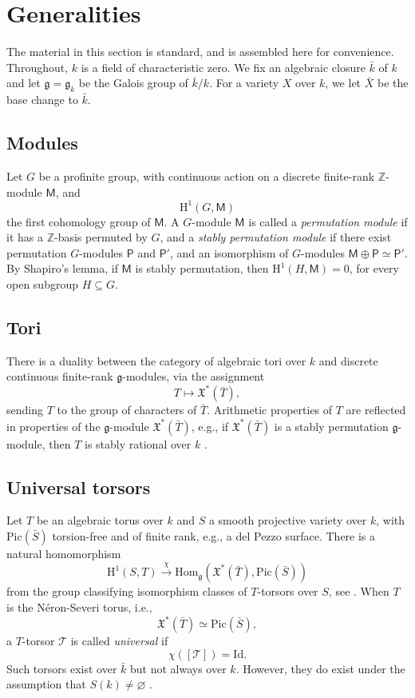 \documentclass[12pt, reqno]{amsart}
\theoremstyle{plain}
\theoremstyle{remark}
\theoremstyle{definition}
\numberwithin{equation}{section}
\def\cT{{\mathcal T}}
\def\bZ{{\mathbb Z}}
\def\rH{{\mathrm H}}
\def\Pic{\mathrm{Pic}}
\def\Hom{\mathrm{Hom}}
\begin{document}
\section{Generalities}
\label{sect:back}

The material in this section is standard, and is assembled here for convenience. 
Throughout, $k$ is a field of characteristic zero. 
We fix an algebraic closure $\bar{k}$ of $k$ and let $\mathfrak g=\mathfrak g_k$ be the Galois group of $\bar{k}/k$. For a variety $X$ over $k$, we let $\bar{X}$ be the base change to $\bar{k}$. 

\subsection*{Modules}
Let $G$ be a profinite group, with continuous action on a discrete finite-rank $\bZ$-module $\mathsf M$, and 
$$
\rH^1(G, \mathsf M)
$$
the first cohomology group of $\mathsf M$.  
A $G$-module $\mathsf M$ is called a {\em permutation module} if it has a $\bZ$-basis permuted by $G$, and a {\em stably permutation module} if there exist permutation $G$-modules $\mathsf P$ and $\mathsf P'$, and an isomorphism of $G$-modules $\mathsf M\oplus \mathsf P\simeq \mathsf P'$. By Shapiro's lemma, if $\mathsf M$ is stably permutation, then $\rH^1(H,\mathsf M)=0$, for every open subgroup $H\subseteq G$. 

\subsection*{Tori}
There is a duality between the category of algebraic tori over $k$ and discrete continuous finite-rank $\mathfrak g$-modules, via the assignment
$$
T \mapsto \mathfrak X^*(\bar{T}), 
$$
sending $T$ to the group of characters of $\bar{T}$. Arithmetic properties of $T$ are reflected in properties of the $\mathfrak g$-module 
$\mathfrak X^*(\bar{T})$, e.g., 
if $\mathfrak X^*(\bar{T})$ is a stably permutation $\mathfrak g$-module, then $T$ is stably rational over $k$ \cite[Section 2]{CS-tori}.   




\subsection*{Universal torsors}
Let $T$ be an algebraic torus over $k$ and $S$ a smooth projective variety over $k$, with $\Pic(\bar{S})$ torsion-free and of finite rank, e.g., a del Pezzo surface.  
There is a natural homomorphism 
$$
\rH^1(S,T) \stackrel{\chi}{\longrightarrow} \Hom_{\mathfrak g} (\mathfrak X^*(\bar{T}), \Pic(\bar{S}))
$$
from the group classifying isomorphism classes of $T$-torsors over $S$, 
see \cite[Theorem 1.5.1]{CTSansucDuke}. 
When $T$ is the N\'eron-Severi torus, i.e., 
$$
\mathfrak X^*(\bar{T})\simeq \Pic(\bar{S}),
$$
a $T$-torsor  $\cT$ is called {\em universal} if 
$$
\chi([\cT]) = \mathrm{Id}.
$$
Such torsors exist over $\bar{k}$ but not always over $k$. However, they do exist under the assumption that $S(k)\neq \varnothing$ \cite[Remark 2.2.9]{CTSansucDuke}. 
\end{document}
